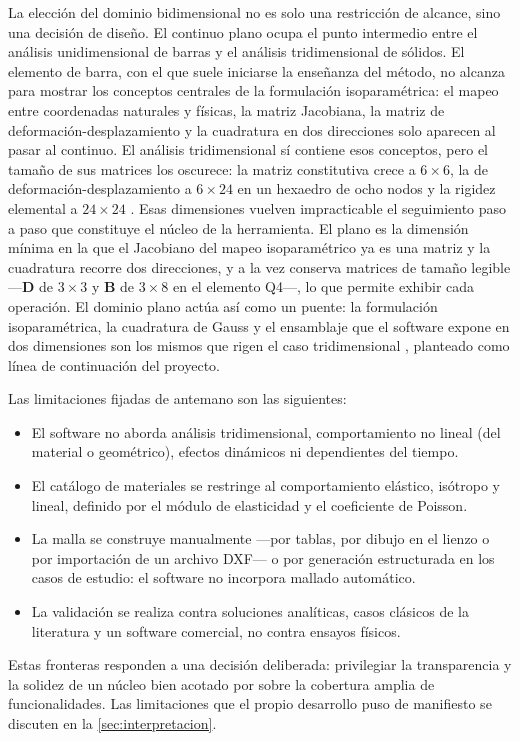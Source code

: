 La elección del dominio bidimensional no es solo una restricción de alcance, sino una decisión de diseño. El continuo plano ocupa el punto intermedio entre el análisis unidimensional de barras y el análisis tridimensional de sólidos. El elemento de barra, con el que suele iniciarse la enseñanza del método, no alcanza para mostrar los conceptos centrales de la formulación isoparamétrica: el mapeo entre coordenadas naturales y físicas, la matriz Jacobiana, la matriz de deformación-desplazamiento y la cuadratura en dos direcciones solo aparecen al pasar al continuo. El análisis tridimensional sí contiene esos conceptos, pero el tamaño de sus matrices los oscurece: la matriz constitutiva crece a $6\times6$, la de deformación-desplazamiento a $6\times24$ en un hexaedro de ocho nodos y la rigidez elemental a $24\times24$ \autocite[p.~218]{cook2002concepts}. Esas dimensiones vuelven impracticable el seguimiento paso a paso que constituye el núcleo de la herramienta. El plano es la dimensión mínima en la que el Jacobiano del mapeo isoparamétrico ya es una matriz y la cuadratura recorre dos direcciones, y a la vez conserva matrices de tamaño legible —$\bm{D}$ de $3\times3$ y $\bm{B}$ de $3\times8$ en el elemento Q4—, lo que permite exhibir cada operación. El dominio plano actúa así como un puente: la formulación isoparamétrica, la cuadratura de Gauss y el ensamblaje que el software expone en dos dimensiones son los mismos que rigen el caso tridimensional \autocite{bathe2014fem,zienkiewicz2013fem}, planteado como línea de continuación del proyecto.

Las limitaciones fijadas de antemano son las siguientes:
\begin{itemize}
    \item El software no aborda análisis tridimensional, comportamiento no lineal (del material o geométrico), efectos dinámicos ni dependientes del tiempo.
    \item El catálogo de materiales se restringe al comportamiento elástico, isótropo y lineal, definido por el módulo de elasticidad y el coeficiente de Poisson.
    \item La malla se construye manualmente —por tablas, por dibujo en el lienzo o por importación de un archivo DXF— o por generación estructurada en los casos de estudio: el software no incorpora mallado automático.
    \item La validación se realiza contra soluciones analíticas, casos clásicos de la literatura y un software comercial, no contra ensayos físicos.
\end{itemize}
Estas fronteras responden a una decisión deliberada: privilegiar la transparencia y la solidez de un núcleo bien acotado por sobre la cobertura amplia de funcionalidades. Las limitaciones que el propio desarrollo puso de manifiesto se discuten en la \autoref{sec:interpretacion}.

